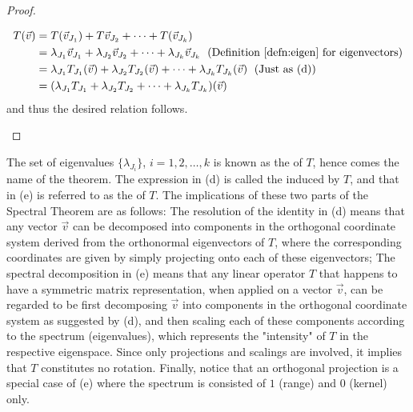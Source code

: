 \begin{proof}
\begin{enumerate}[label=(\alph*)]
\begin{align*}
T(\vec{v}) &= T(\vec{v}_{J_1}) + T\vec{v}_{J_2} + \cdots + T(\vec{v}_{J_k}) \\
&= \lambda_{J_1}\vec{v}_{J_1} + \lambda_{J_2}\vec{v}_{J_2} + \cdots + \lambda_{J_k}\vec{v}_{J_k} \text{\; (Definition \ref{defn:eigen} for eigenvectors)} \\
&= \lambda_{J_1}T_{J_1}(\vec{v}) + \lambda_{J_2}T_{J_2}(\vec{v}) + \cdots + \lambda_{J_k}T_{J_k}(\vec{v}) \text{\; (Just as (d))} \\
&= (\lambda_{J_1}T_{J_1} + \lambda_{J_2}T_{J_2} + \cdots + \lambda_{J_k}T_{J_k})(\vec{v})
\end{align*}
and thus the desired relation follows.
\end{enumerate}
\end{proof}
The set of eigenvalues $\{\lambda_{J_i}\}$, $i = 1,2,\ldots,k$ is known as the  of $T$, hence comes the name of the theorem. The expression in (d) is called the  induced by $T$, and that in (e) is referred to as the  of $T$. The implications of these two parts of the Spectral Theorem are as follows: The resolution of the identity in (d) means that any vector $\vec{v}$ can be decomposed into components in the orthogonal coordinate system derived from the orthonormal eigenvectors of $T$, where the corresponding coordinates are given by simply projecting onto each of these eigenvectors; The spectral decomposition in (e) means that any linear operator $T$ that happens to have a symmetric matrix representation, when applied on a vector $\vec{v}$, can be regarded to be first decomposing $\vec{v}$ into components in the orthogonal coordinate system as suggested by (d), and then scaling each of these components according to the spectrum (eigenvalues), which represents the "intensity" of $T$ in the respective eigenspace. Since only projections and scalings are involved, it implies that $T$ constitutes no rotation. Finally, notice that an orthogonal projection is a special case of (e) where the spectrum is consisted of $1$ (range) and $0$ (kernel) only.\par
